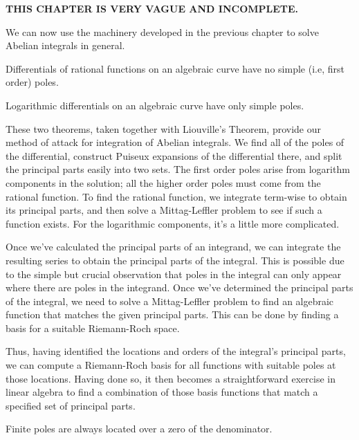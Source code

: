 

{\bf THIS CHAPTER IS VERY VAGUE AND INCOMPLETE.}

We can now use the machinery developed in the previous chapter to
solve Abelian integrals in general.

\theorem
Differentials of rational functions on an algebraic curve have no
simple (i.e, first order) poles.
\endtheorem

\theorem
Logarithmic differentials on an algebraic curve have only simple
poles.
\endtheorem

These two theorems, taken together with Liouville's Theorem, provide
our method of attack for integration of Abelian integrals.  We find
all of the poles of the differential, construct Puiseux expansions of
the differential there, and split the principal parts easily into two
sets.  The first order poles arise from logarithm components in the
solution; all the higher order poles must come from the rational
function.  To find the rational function, we integrate term-wise to
obtain its principal parts, and then solve a Mittag-Leffler problem to
see if such a function exists.  For the logarithmic components,
it's a little more complicated.

Once we've calculated the principal parts of an integrand, we can
integrate the resulting series to obtain the principal parts of the
integral.  This is possible due to the simple but crucial observation
that poles in the integral can only appear where there are poles in
the integrand.  Once we've determined the principal parts of the
integral, we need to solve a Mittag-Leffler problem to find an
algebraic function that matches the given principal parts.  This can
be done by finding a basis for a suitable Riemann-Roch space.

Thus, having identified the
locations and orders of the integral's principal parts, we can compute
a Riemann-Roch basis for all functions with suitable poles at those
locations.  Having done so, it then becomes a straightforward exercise
in linear algebra to find a combination of those basis functions
that match a specified set of principal parts.

\theorem
Finite poles are always located over a zero of the denominator.
\endtheorem

\begin{comment}
The techniques of the previous chapter suffice to compute the {\it
algebraic} portion of an Abelian integral, which is to say, an
algebraic function.  Liouville's theorem, however, tells us that there
can also be logarithmic components in the integral.  The two can be
easily separated, since the rational portion of the integral
corresponds to poles of second order poles and higher in the integrand,
while the logarithmic portion corresponds to first order poles
in the integrand.
\end{comment}

